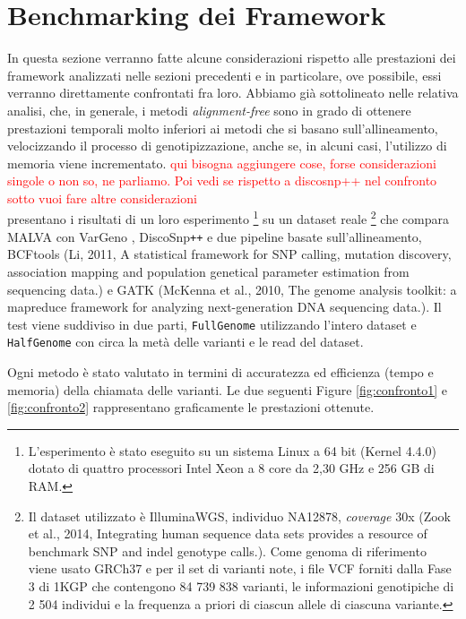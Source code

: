 \documentclass[../main.tex]{subfiles}
\begin{document}
\section{Benchmarking dei Framework}

In questa sezione verranno fatte alcune considerazioni rispetto alle prestazioni dei framework analizzati nelle sezioni precedenti e in particolare, ove possibile, essi verranno direttamente confrontati fra loro. Abbiamo già sottolineato nelle relativa analisi, che, in generale, i metodi \textit{alignment-free} sono in grado di ottenere prestazioni temporali molto inferiori ai metodi che si basano sull'allineamento, velocizzando il processo di genotipizzazione, anche se, in alcuni casi, l'utilizzo di memoria viene incrementato. \textcolor{red}{qui bisogna aggiungere cose, forse considerazioni singole o non so, ne parliamo. Poi vedi se rispetto a discosnp++ nel confronto sotto vuoi fare altre considerazioni}\\

\noindent
\cite{bernardini2019malva} presentano i risultati di un loro esperimento \footnote{L'esperimento è stato eseguito su un sistema Linux a 64 bit (Kernel 4.4.0) dotato di quattro processori Intel Xeon a 8 core da 2,30 GHz e 256 GB di RAM.} su un dataset reale \footnote{Il dataset utilizzato è IlluminaWGS, individuo NA12878, \textit{coverage} 30x (Zook et al., 2014, Integrating human sequence data sets provides a resource of benchmark SNP and indel genotype calls.). Come genoma di riferimento viene usato GRCh37 e per il set di varianti note, i file VCF forniti dalla Fase 3 di 1KGP che contengono  84 739 838 varianti, le informazioni genotipiche di 2 504 individui e la frequenza a priori di ciascun allele di ciascuna variante.} che compara MALVA con VarGeno \cite{sun-medvedev2018vargeno}, DiscoSnp\texttt{++} \cite{peterlongo2017discosnp++} e due pipeline basate sull'allineamento, BCFtools (Li, 2011, A statistical framework for SNP calling, mutation discovery, association mapping and population genetical parameter estimation from sequencing data.) e GATK (McKenna et al., 2010, The genome analysis toolkit: a mapreduce framework for analyzing next-generation DNA sequencing data.). Il test viene suddiviso in due parti, \texttt{FullGenome} utilizzando l'intero dataset e \texttt{HalfGenome} con circa la metà delle varianti e le read del dataset.


Ogni metodo è stato valutato in termini di accuratezza ed efficienza (tempo e memoria) della chiamata delle varianti. Le due seguenti Figure \ref{fig:confronto1} e \ref{fig:confronto2} rappresentano graficamente le prestazioni ottenute.
\end{document}
